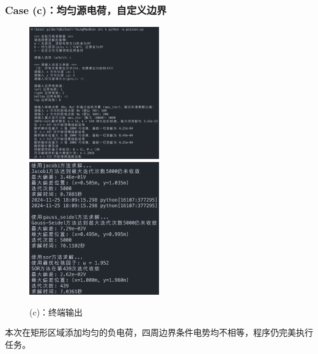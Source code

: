 \subsubsection{Case (c)：均匀源电荷，自定义边界}
\begin{figure}[H]
    \centering
    \includegraphics[width=0.5\textwidth]{Problem_1/figs/c_terminal_1.png}
    \includegraphics[width=0.5\textwidth]{Problem_1/figs/c_terminal_2.png}
    \caption{(c)：终端输出}
\end{figure}
本次在矩形区域添加均匀的负电荷，四周边界条件电势均不相等，程序仍完美执行任务。
